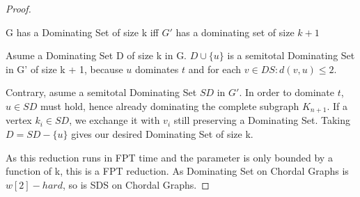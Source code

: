 \begin{proof}
    \begin{corollary}
    G has a Dominating Set of size k iff $G'$ has a dominating set of size $k+1$
    \end{corollary}
    \begin{subproof}
    Asume a Dominating Set D of size k in G. $D \cup \{u\}$ is a semitotal Dominating Set in G' of size k + 1, because $u$ dominates $t$ and for each $v \in DS: d(v, u) \leq 2$.

    Contrary, asume a semitotal Dominating Set $SD$ in $G'$. In order to dominate $t$, $u \in SD$ must hold, hence already dominating the complete subgraph $K_{n+1}$. If a vertex $k_i \in SD$, we exchange it with $v_i$ still preserving a Dominating Set. Taking $D = SD - \{ u \}$ gives our desired Dominating Set of size k.
    \end{subproof}
    As this reduction runs in FPT time and the parameter is only bounded by a function of k, this is a FPT reduction. As Dominating Set on Chordal Graphs is $w[2]-hard$, so is SDS on Chordal Graphs.

\end{proof}
